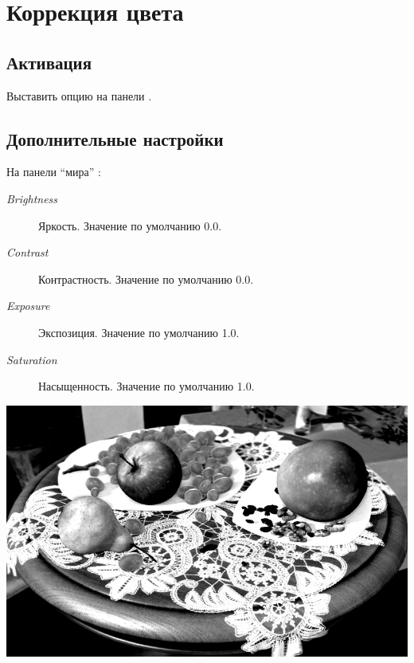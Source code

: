 \documentclass[a4paper,12pt,oneside]{sphinxmanual}
\begin{document}
\begin{DUlineblock}{0em}
\item[] 
\end{DUlineblock}


\section{Коррекция цвета}
\label{postprocessing_effects:index-5}\label{postprocessing_effects:color-correction}\label{postprocessing_effects:id17}

\subsection{Активация}
\label{postprocessing_effects:id18}
Выставить опцию  на панели .


\subsection{Дополнительные настройки}
\label{postprocessing_effects:id19}
На панели ``мира'' :
\begin{description}
\item[{\emph{Brightness}}] \leavevmode
Яркость. Значение по умолчанию 0.0.

\item[{\emph{Contrast}}] \leavevmode
Контрастность. Значение по умолчанию 0.0.

\item[{\emph{Exposure}}] \leavevmode
Экспозиция. Значение по умолчанию 1.0.

\item[{\emph{Saturation}}] \leavevmode
Насыщенность. Значение по умолчанию 1.0.

\end{description}

{\hfill\includegraphics[width=1.000\linewidth]{color_correction.jpg}\hfill}
\end{document}
